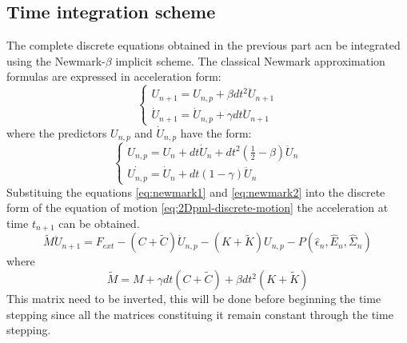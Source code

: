 \subsection{Time integration scheme}
The complete discrete equations obtained in the previous part acn be integrated using the Newmark-$\beta$ implicit scheme. The classical Newmark approximation formulas are expressed in acceleration form:
\begin{equation}
\begin{cases}
U_{n+1} = U_{n,p} + \beta dt^2 \ddot{U}_{n+1} \\
\dot{U}_{n+1} = \dot{U}_{n,p} + \gamma dt \ddot{U}_{n+1}
\end{cases}
\label{eq:newmark1}
\end{equation}
where the predictors $U_{n,p}$ and $\dot{U}_{n,p}$ have the form:
\begin{equation}
\begin{cases}
U_{n,p} = U_n + dt \dot{U}_n + dt^2 \left(\frac{1}{2} -\beta  \right)\ddot{U}_n \\
\dot{U_{n,p}} = \dot{U}_n + dt (1-\gamma)\ddot{U}_n
\end{cases}
\label{eq:newmark2}
\end{equation}
Substituing the equations \ref{eq:newmark1} and \ref{eq:newmark2} into the discrete form of the equation of motion \ref{eq:2Dpml-discrete-motion} the acceleration at time $t_{n+1}$ can be obtained.
\begin{equation}
\tilde{M}\ddot{U}_{n+1} = F_{ext} - \left(C+\tilde{C}\right)\dot{U}_{n,p} - \left(K+\tilde{K}\right)U_{n,p} - P(\hat{\epsilon}_n,\hat{E}_n,\hat{\Sigma}_n)
\end{equation}
where 
\begin{equation}
\tilde{M} = M + \gamma dt \left(C+\tilde{C}\right) + \beta dt^2 \left(K+\tilde{K}\right)
\end{equation}
This matrix need to be inverted, this will be done before beginning the time stepping since all the matrices constituing it remain constant through the time stepping. 









 





